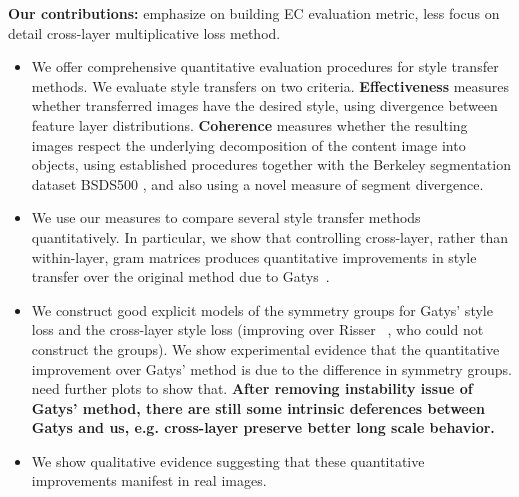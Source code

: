 \documentclass[runningheads]{llncs}
\begin{document}
\textbf{Our contributions:} 
\todo emphasize on building EC evaluation metric, less focus on detail cross-layer multiplicative loss method.
\begin{itemize}
\item We offer comprehensive quantitative evaluation procedures for style transfer methods. We evaluate style transfers on two criteria.  {\bf Effectiveness} measures whether transferred images have the desired style, using divergence between
feature layer distributions.  {\bf Coherence} measures whether the resulting images respect the underlying
decomposition of the content image into objects, using established procedures together with the Berkeley segmentation
dataset BSDS500 \cite{arbelaez2011contour}, and also using a novel measure of segment divergence.
\item We use our measures to compare several style transfer methods quantitatively.  In particular, we show that controlling cross-layer, rather than within-layer, gram matrices produces quantitative  improvements in style transfer over the original method due to Gatys~\cite{gatys2016image}.  
\item We construct good explicit models of the symmetry groups for Gatys' style loss and the cross-layer style loss 
(improving over Risser \ea~\cite{risser2017stable}, who could not construct the groups).  We show experimental evidence that 
the quantitative improvement over Gatys' method is due to the difference in symmetry groups. \todo need further plots to show that. \bf{After removing instability issue of Gatys' method, there are still some intrinsic deferences between Gatys and us, e.g. cross-layer preserve better long scale behavior.  }  
\item We show qualitative evidence suggesting that these quantitative improvements manifest in real images.
\end{itemize}
\end{document}
